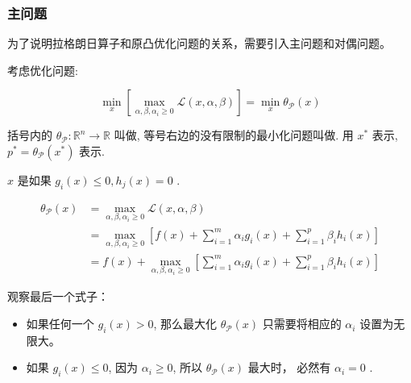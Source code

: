 \subsubsection{主问题}

为了说明拉格朗日算子和原凸优化问题的关系，需要引入主问题和对偶问题。

考虑优化问题:

\begin{problem}
    \label{pbl:primal}
    \begin{equation}
\min _{x}\left[\max _{\alpha, \beta, \alpha_{i} \geqslant 0} \mathcal{L}(x, \alpha, \beta)\right]=\min _{x} \theta_{\mathcal{P}}(x)
\end{equation}

括号内的 $ \theta_{\mathcal{P}}: \mathbb{R}^{n} \rightarrow \mathbb{R} $ 叫做, 等号右边的没有限制的最小化问题叫做. 用 $ x^{*} $ 表示,$ p^{*}=\theta_{\mathcal{P}}\left(x^{*}\right) $ 表示.
\end{problem}

\begin{definition}
    $ x $ 是如果 $ g_{i}(x) \leqslant 0, h_{j}(x)=0 $ .
\end{definition}


\begin{equation}
\begin{aligned}
\theta_{\mathcal{P}}(x) &=\max _{\alpha, \beta, \alpha_{i} \geqslant 0} \mathcal{L}(x, \alpha, \beta) \\
&=\max _{\alpha, \beta, \alpha_{i} \geqslant 0}\left[f(x)+\sum_{i=1}^{m} \alpha_{i} g_{i}(x)+\sum_{i=1}^{p} \beta_{i} h_{i}(x)\right] \\
&=f(x)+\max _{\alpha, \beta, \alpha_{i} \geqslant 0}\left[\sum_{i=1}^{m} \alpha_{i} g_{i}(x)+\sum_{i=1}^{p} \beta_{i} h_{i}(x)\right]
\end{aligned}
\end{equation}

观察最后一个式子：

\begin{itemize}
    \item 如果任何一个 $ g_{i}(x)>0 $, 那么最大化 $ \theta_{\mathcal{P}}(x) $ 只需要将相应的 $ \alpha_{i} $ 设置为无限大。
    \item 如果 $ g_{i}(x) \leqslant 0 $, 因为 $ \alpha_{i} \geqslant 0 $, 所以 $ \theta_{\mathcal{P}}(x) $ 最大时， 必然有 $ \alpha_{i}=0 $ .
\end{itemize}

